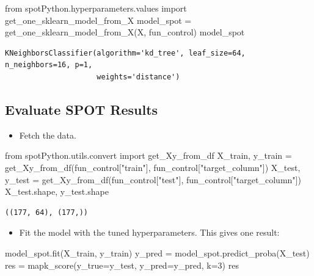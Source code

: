 \documentclass[
  letterpaper,
  DIV=11,
  numbers=noendperiod]{scrreprt}
\newenvironment{Shaded}{\begin{snugshade}}{\end{snugshade}}
\newcommand{\DecValTok}[1]{\textcolor[rgb]{0.68,0.00,0.00}{#1}}
\newcommand{\ImportTok}[1]{\textcolor[rgb]{0.00,0.46,0.62}{#1}}
\newcommand{\NormalTok}[1]{\textcolor[rgb]{0.00,0.23,0.31}{#1}}
\newcommand{\OperatorTok}[1]{\textcolor[rgb]{0.37,0.37,0.37}{#1}}
\newcommand{\StringTok}[1]{\textcolor[rgb]{0.13,0.47,0.30}{#1}}
\providecommand{\tightlist}{%
  \setlength{\itemsep}{0pt}\setlength{\parskip}{0pt}}\usepackage{longtable,booktabs,array}
\begin{document}
\begin{Shaded}
\begin{Highlighting}[]
\ImportTok{from}\NormalTok{ spotPython.hyperparameters.values }\ImportTok{import}\NormalTok{ get\_one\_sklearn\_model\_from\_X}
\NormalTok{model\_spot }\OperatorTok{=}\NormalTok{ get\_one\_sklearn\_model\_from\_X(X, fun\_control)}
\NormalTok{model\_spot}
\end{Highlighting}
\end{Shaded}

\begin{verbatim}
KNeighborsClassifier(algorithm='kd_tree', leaf_size=64, n_neighbors=16, p=1,
                     weights='distance')
\end{verbatim}

\hypertarget{evaluate-spot-results-3}{%
\subsection{Evaluate SPOT Results}\label{evaluate-spot-results-3}}

\begin{itemize}
\tightlist
\item
  Fetch the data.
\end{itemize}

\begin{Shaded}
\begin{Highlighting}[]
\ImportTok{from}\NormalTok{ spotPython.utils.convert }\ImportTok{import}\NormalTok{ get\_Xy\_from\_df}
\NormalTok{X\_train, y\_train }\OperatorTok{=}\NormalTok{ get\_Xy\_from\_df(fun\_control[}\StringTok{"train"}\NormalTok{], fun\_control[}\StringTok{"target\_column"}\NormalTok{])}
\NormalTok{X\_test, y\_test }\OperatorTok{=}\NormalTok{ get\_Xy\_from\_df(fun\_control[}\StringTok{"test"}\NormalTok{], fun\_control[}\StringTok{"target\_column"}\NormalTok{])}
\NormalTok{X\_test.shape, y\_test.shape}
\end{Highlighting}
\end{Shaded}

\begin{verbatim}
((177, 64), (177,))
\end{verbatim}

\begin{itemize}
\tightlist
\item
  Fit the model with the tuned hyperparameters. This gives one result:
\end{itemize}

\begin{Shaded}
\begin{Highlighting}[]
\NormalTok{model\_spot.fit(X\_train, y\_train)}
\NormalTok{y\_pred }\OperatorTok{=}\NormalTok{ model\_spot.predict\_proba(X\_test)}
\NormalTok{res }\OperatorTok{=}\NormalTok{ mapk\_score(y\_true}\OperatorTok{=}\NormalTok{y\_test, y\_pred}\OperatorTok{=}\NormalTok{y\_pred, k}\OperatorTok{=}\DecValTok{3}\NormalTok{)}
\NormalTok{res}
\end{Highlighting}
\end{Shaded}
\end{document}
